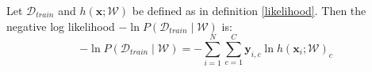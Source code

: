\begin{definition}
	\label{negative_log-likelihood}
	Let $\mathcal{D}_{train}$ and $h(\mathbf{x}; \mathcal{W})$ be defined as in definition \ref{likelihood}. Then the negative log likelihood $-\ln P(\mathcal{D}_{train} \mid \mathcal{W})$ is:
	$$
	- \ln P(\mathcal{D}_{train} \mid \mathcal{W}) = - \sum\limits_{i=1}^N\sum\limits_{c=1}^C \mathbf{y}_{i,c} \ln h(\mathbf{x}_i;\mathcal{W})_c
	$$
\end{definition}
